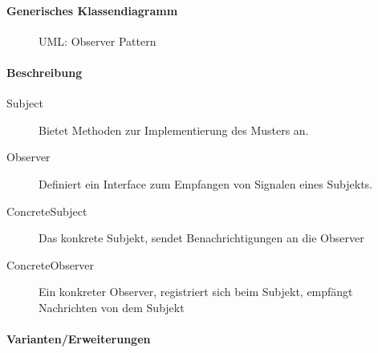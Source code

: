 			\paragraph{Generisches Klassendiagramm}
				\begin{figure}[ht]
					\centering
					\caption{UML: Observer Pattern}
				\end{figure}

			\paragraph{Beschreibung}
				\begin{description}
					\item[Subject] Bietet Methoden zur Implementierung des Musters an.
					\item[Observer] Definiert ein Interface zum Empfangen von Signalen eines Subjekts.
					\item[ConcreteSubject] Das konkrete Subjekt, sendet Benachrichtigungen an die Observer
					\item[ConcreteObserver] Ein konkreter Observer, registriert sich beim Subjekt, empfängt Nachrichten von dem Subjekt
				\end{description}

			\paragraph{Varianten/Erweiterungen}

